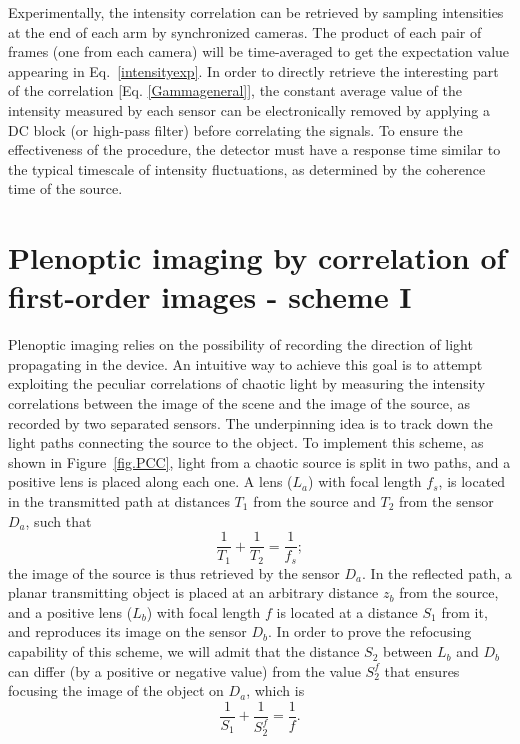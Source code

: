 \documentclass[aps,pra,amssymb,twocolumn,amsmath,superscriptaddress,showpacs,10pt]{revtex4-1}
\begin{document}
Experimentally, the intensity correlation can be retrieved by sampling intensities at the end of each arm by synchronized cameras. The product of each pair of frames (one from each camera) will be time-averaged to get the expectation value appearing in Eq.\ \eqref{intensityexp}. In order to directly retrieve the interesting part of the correlation [Eq. \eqref{Gammageneral}], the constant average value of the intensity measured by each sensor can be electronically removed by applying a DC block (or high-pass filter) before correlating the signals. To ensure the effectiveness of the procedure, the detector must have a response time similar to the typical timescale of intensity fluctuations, as determined by the coherence time of the source.


\section{Plenoptic imaging by correlation of first-order images - scheme I}

Plenoptic imaging relies on the possibility of recording the direction of light propagating in the device. An intuitive way to achieve this goal is to attempt exploiting the peculiar correlations of chaotic light by measuring the intensity correlations between the image of the scene and the image of the source, as recorded by two separated sensors. The underpinning idea is to track down the light paths connecting the source to the object. To implement this scheme, as shown in Figure~\ref{fig.PCC}, light from a chaotic source is split in two paths, and a positive lens is placed along each one. A lens ($L_a$) with focal length $f_s$, is located in the transmitted path at distances $T_1$ from the source and $T_2$ from the sensor $D_a$, such that
\begin{equation}\label{fs}
\frac{1}{T_1} + \frac{1}{T_2} = \frac{1}{f_s};
\end{equation}
the image of the source is thus retrieved by the sensor $D_a$. In the reflected path, a planar transmitting object is placed at an arbitrary distance $z_b$ from the source, and a positive lens ($L_b$) with focal length $f$ is located at a distance $S_1$ from it, and reproduces its image on the sensor $D_b$. In order to prove the refocusing capability of this scheme, we will admit that the distance $S_2$ between $L_b$ and $D_b$ can differ (by a positive or negative value) from the value $S_2^f$ that ensures focusing the image of the object on $D_a$, which is
\begin{equation}\label{fo}
\frac{1}{S_1} + \frac{1}{S_2^f} = \frac{1}{f}.
\end{equation}
\end{document}
